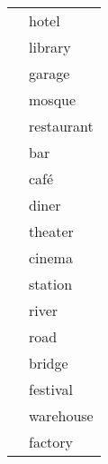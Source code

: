 \begin{center}
\begin{longtable}{rl}
                        & hotel                                                                                    \\
                        & library                                                                                  \\
                        & garage                                                                                   \\
                        & mosque                                                                                   \\
                        & restaurant                                                                               \\
                        & bar                                                                                      \\
                        & café                                                                                     \\
                        & diner                                                                                    \\
                        & theater                                                                                  \\
                        & cinema                                                                                   \\
                        & station                                                                                  \\
                        & river                                                                                    \\
                        & road                                                                                     \\
                        & bridge                                                                                   \\
                        & festival                                                                                 \\
                        & warehouse                                                                                \\
                        & factory                                                                                  \\

\end{longtable}
\end{center}
